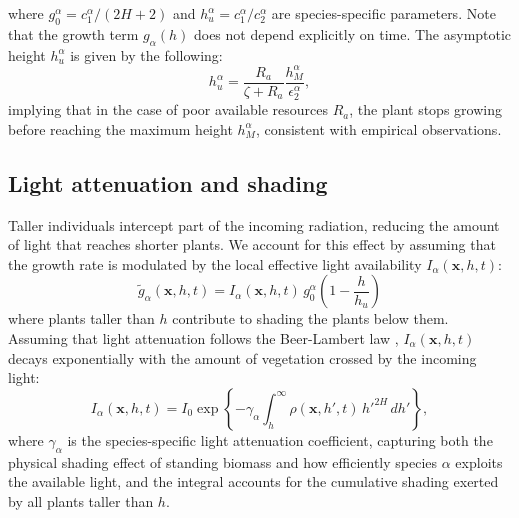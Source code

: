 \documentclass[aps,pre,twocolumn,superscriptaddress,10pt]{revtex4-2}
\begin{document}
where $g_0^{\alpha}= c^{\alpha}_1/(2H+2)$ and $h_u^{\alpha}=c^{\alpha}_1/c^{\alpha}_2$ are species-specific parameters. Note that the growth term $g_{\alpha}(h)$ does not depend explicitly on time. The asymptotic height $h^{\alpha}_u$ is given by the following:
\begin{equation}
    h^{\alpha}_u = \frac{R_{a}}{\zeta + R_{a}} \frac{h^{\alpha}_{M}}{\epsilon^{\alpha}_2},
    \label{eq:hu-vs-hmax}
\end{equation}
implying that in the case of poor available resources $R_{a}$, the plant stops growing before reaching the maximum height $h^{\alpha}_{M}$, consistent with empirical observations. 

\subsection*{Light attenuation and shading}
Taller individuals intercept part of the incoming radiation, reducing the amount of light that reaches shorter plants. We account for this effect by assuming that the growth rate is modulated by the local effective light availability $I_{\alpha}(\mathbf{x},h,t)$:
\begin{equation}
    \tilde{g}_{\alpha}(\mathbf{x},h,t) = I_{\alpha}(\mathbf{x},h,t)\,g_{0}^{\alpha} \left(1-\frac{h}{h_u}\right)
\end{equation}
where plants taller than $h$ contribute to shading the plants below them. Assuming that light attenuation follows the Beer-Lambert law \cite{monsi1953lichtfaktor,MONSI2005}, $I_{\alpha}(\mathbf{x},h,t)$ decays exponentially with the amount of vegetation crossed by the incoming light:
\begin{equation}
I_{\alpha}(\mathbf{x},h,t)=I_0\exp\left\{-\gamma_{\alpha}
\int_h^{\infty}\rho(\mathbf{x},h',t)\,h'^{2H}\,dh'
\right\},
\end{equation}
where $\gamma_{\alpha}$ is the species-specific light attenuation coefficient, capturing both the physical shading effect of standing biomass and how efficiently species $\alpha$ exploits the available light, and the integral accounts for the cumulative shading exerted by all plants taller than $h$.
\end{document}
